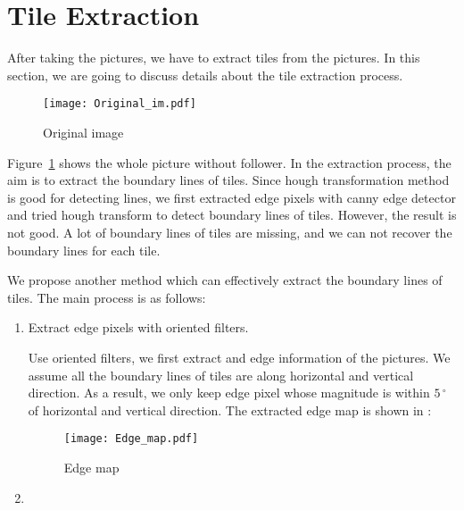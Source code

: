\section{Tile Extraction}
After taking the pictures, we have to extract tiles from the pictures.
In this section, we are going to discuss details about the tile 
extraction process.

\begin{figure}[htbp]
	  \centering
	  \texttt{[image: Original\_im.pdf]}
	  \caption{Original image}
	  \label{Original_im}
\end{figure}

Figure~\ref{Original_im} shows the whole picture without follower. 
In the extraction process, the aim is to extract the boundary lines of 
tiles. Since hough transformation method is good for detecting lines, we
first extracted edge pixels with canny edge detector and tried hough 
transform to detect boundary lines of tiles. However, the result is not 
good. A lot of boundary lines of tiles are missing, and we can not recover 
the boundary lines for each tile.

We propose another method which can effectively extract the boundary lines of
 tiles. The main process is as follows:
\begin{enumerate}
	\item Extract edge pixels with oriented filters.
	
			Use oriented filters, we first extract and edge information of the 
			pictures. We assume all the boundary lines of tiles are along horizontal 
			and vertical direction. As a result, we only keep edge pixel whose 
			magnitude is within $5\,^{\circ}$ of horizontal and vertical direction. 
			The extracted edge map is shown in :
			
			
			\begin{figure}[htbp]
				  \centering
				  \texttt{[image: Edge\_map.pdf]}
				  \caption{Edge map}
				  \label{Edge_map}
			\end{figure}
	\item
\end{enumerate}

 

